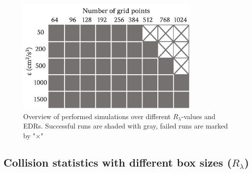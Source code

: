 \begin{figure}[ht]
\centering
\includegraphics[width=0.8\textwidth]{Figures/Chap2/perform.jpg}
\caption {Overview of performed simulations over different $R_\lambda$-values and EDRs. Successful runs are shaded with gray, failed runs are marked by "$\times$"} \label{fig:perform}
\end{figure}


\subsection{Collision statistics with different box sizes ($R_\lambda$)} \label{sec:ch2_re}

